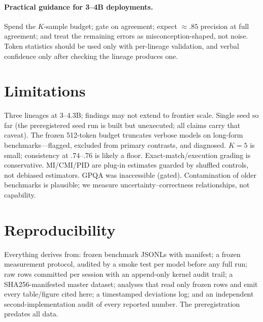 \documentclass[10pt]{article}
\begin{document}
\paragraph{Practical guidance for 3--4B deployments.} Spend the $K$-sample budget; gate on
agreement; expect ${\approx}.85$ precision at full agreement; and treat the remaining errors as
misconception-shaped, not noise. Token statistics should be used only with per-lineage
validation, and verbal confidence only after checking the lineage produces one.

\section{Limitations}
Three lineages at 3--4.3B; findings may not extend to frontier scale. Single seed so far (the
preregistered seed run is built but unexecuted; all claims carry that caveat). The frozen
512-token budget truncates verbose models on long-form benchmarks---flagged, excluded from
primary contrasts, and diagnosed. $K{=}5$ is small; consistency at $.74$--$.76$ is likely a
floor. Exact-match/execution grading is conservative. MI/CMI/PID are plug-in estimates guarded
by shuffled controls, not debiased estimators. GPQA was inaccessible (gated). Contamination of
older benchmarks is plausible; we measure uncertainty--correctness relationships, not capability.

\section{Reproducibility}
Everything derives from: frozen benchmark JSONLs with manifest; a frozen measurement protocol,
audited by a smoke test per model before any full run; raw rows committed per session with an
append-only kernel audit trail; a SHA256-manifested master dataset; analyses that read only
frozen rows and emit every table/figure cited here; a timestamped deviations log; and an
independent second-implementation audit of every reported number. The preregistration predates
all data.



\end{document}
